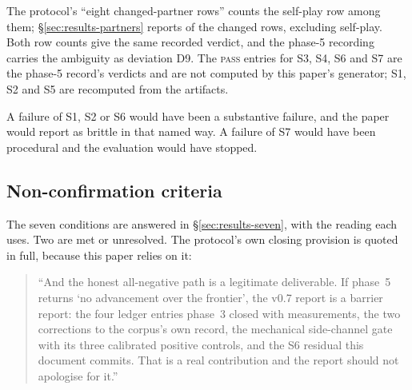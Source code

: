 The protocol's ``eight changed-partner rows'' counts the self-play row among them; \S\ref{sec:results-partners}
reports \vsevenSonePositive{} of the \vsevenSoneRows{} changed rows, excluding self-play. Both row counts give
the same recorded verdict, and the phase-5 recording carries the ambiguity as deviation D9. The
\textsc{pass} entries for S3, S4, S6 and S7 are the phase-5 record's verdicts and are not computed
by this paper's generator; S1, S2 and S5 are recomputed from the artifacts.

A failure of S1, S2 or S6 would have been a substantive failure, and the paper would report
\sestina{} as brittle in that named way. A failure of S7 would have been procedural and the
evaluation would have stopped.

\subsection*{Non-confirmation criteria}

The seven conditions are answered in \S\ref{sec:results-seven}, with the reading each uses. Two are
met or unresolved. The protocol's own closing provision is quoted in full, because this paper relies
on it:

\begin{quote}\small
``And the honest all-negative path is a legitimate deliverable. If phase~5 returns `no advancement over
the frontier', the v0.7 report is a barrier report: the four ledger entries phase~3 closed with
measurements, the two corrections to the corpus's own record, the mechanical side-channel gate with its
three calibrated positive controls, and the S6 residual this document commits. That is a real
contribution and the report should not apologise for it.''
\end{quote}
